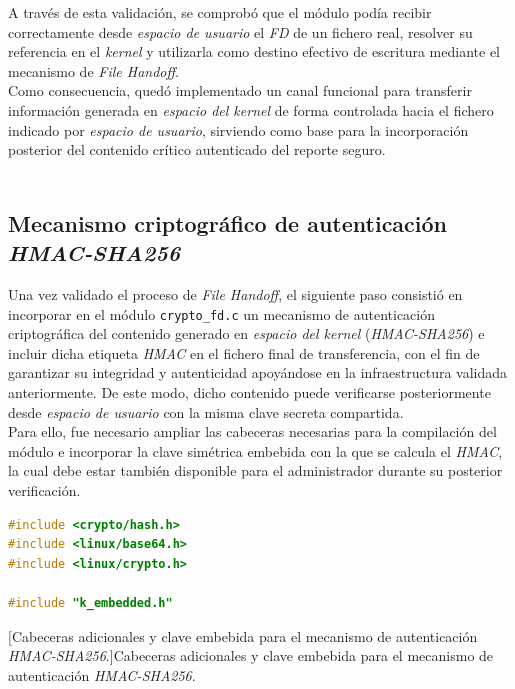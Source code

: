 A través de esta validación, se comprobó que el módulo podía recibir correctamente desde \textit{espacio de usuario} el \textit{FD} de un fichero real, resolver su referencia en el \textit{kernel} y utilizarla como destino efectivo de escritura mediante el mecanismo de \textit{File Handoff}.\\

Como consecuencia, quedó implementado un canal funcional para transferir información generada en \textit{espacio del kernel} de forma controlada hacia el fichero indicado por \textit{espacio de usuario}, sirviendo como base para la incorporación posterior del contenido crítico autenticado del reporte seguro.\\

\

\subsection{Mecanismo criptográfico de autenticación \textit{HMAC-SHA256}}
\label{sec:proto-crypto}

Una vez validado el proceso de \textit{File Handoff}, el siguiente paso consistió en incorporar en el módulo \verb|crypto_fd.c| un mecanismo de autenticación criptográfica del contenido generado en \textit{espacio del kernel} (\textit{HMAC-SHA256}) e incluir dicha etiqueta \textit{HMAC} en el fichero final de transferencia, con el fin de garantizar su integridad y autenticidad apoyándose en la infraestructura validada anteriormente.
De este modo, dicho contenido puede verificarse posteriormente desde \textit{espacio de usuario} con la misma clave secreta compartida.\\

Para ello, fue necesario ampliar las cabeceras necesarias para la compilación del módulo e incorporar la clave simétrica embebida con la que se calcula el \textit{HMAC}, la cual debe estar también disponible para el administrador durante su posterior verificación.\\

\begin{lstlisting}[language=C]
#include <crypto/hash.h>
#include <linux/base64.h>
#include <linux/crypto.h>

#include "k_embedded.h"
\end{lstlisting}
\captionsetup{type=code,justification=centering,singlelinecheck=false}
[Cabeceras adicionales y clave embebida para el mecanismo de autenticación \textit{HMAC-SHA256}.]{Cabeceras adicionales y clave embebida para el mecanismo de autenticación \textit{HMAC-SHA256}.}
\label{cod:crypto_headers}
\vspace{\baselineskip}

